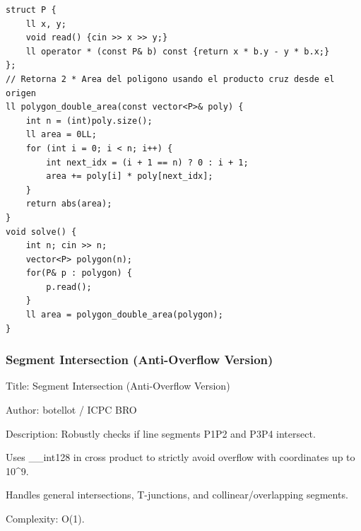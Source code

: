 \documentclass[10pt,landscape,twocolumn]{article}
\begin{document}
\begin{lstlisting}
struct P {
    ll x, y;
    void read() {cin >> x >> y;}
    ll operator * (const P& b) const {return x * b.y - y * b.x;}
};
// Retorna 2 * Area del poligono usando el producto cruz desde el origen
ll polygon_double_area(const vector<P>& poly) {
    int n = (int)poly.size();
    ll area = 0LL;
    for (int i = 0; i < n; i++) {
        int next_idx = (i + 1 == n) ? 0 : i + 1;
        area += poly[i] * poly[next_idx];
    }
    return abs(area);
}
void solve() {
    int n; cin >> n;
    vector<P> polygon(n);
    for(P& p : polygon) {
        p.read();
    }
    ll area = polygon_double_area(polygon);
}
\end{lstlisting}

\subsubsection{Segment Intersection (Anti-Overflow Version)}
\begin{flushleft}
\footnotesize\ttfamily
\par\noindent Title: Segment Intersection (Anti-Overflow Version)
\par\noindent Author: botellot / ICPC BRO
\par\noindent Description: Robustly checks if line segments P1P2 and P3P4 intersect.
\par\noindent Uses \_\_int128 in cross product to strictly avoid overflow with coordinates up to 10\textasciicircum{}9.
\par\noindent Handles general intersections, T-junctions, and collinear/overlapping segments.
\par\noindent Complexity: O(1).
\end{flushleft}
\end{document}
